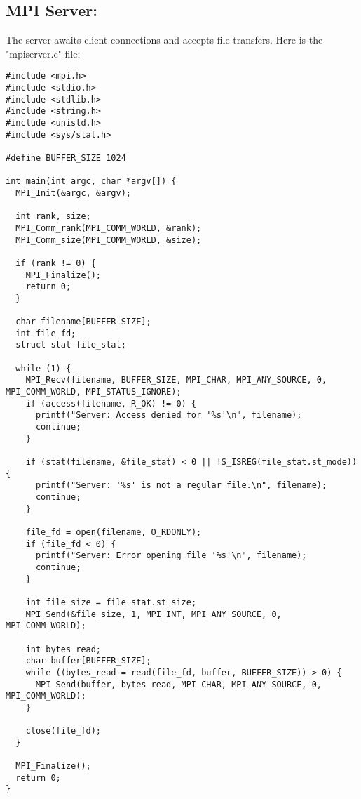 \documentclass{article}
\begin{document}
\subsection{MPI Server:}
The server awaits client connections and accepts file transfers. Here is the "mpiserver.c" file:
\begin{verbatim}
#include <mpi.h>
#include <stdio.h>
#include <stdlib.h>
#include <string.h>
#include <unistd.h>  
#include <sys/stat.h>  

#define BUFFER_SIZE 1024

int main(int argc, char *argv[]) {
  MPI_Init(&argc, &argv);

  int rank, size;
  MPI_Comm_rank(MPI_COMM_WORLD, &rank);
  MPI_Comm_size(MPI_COMM_WORLD, &size);

  if (rank != 0) {
    MPI_Finalize();
    return 0;
  }

  char filename[BUFFER_SIZE];
  int file_fd;
  struct stat file_stat;

  while (1) {
    MPI_Recv(filename, BUFFER_SIZE, MPI_CHAR, MPI_ANY_SOURCE, 0, MPI_COMM_WORLD, MPI_STATUS_IGNORE);
    if (access(filename, R_OK) != 0) {
      printf("Server: Access denied for '%s'\n", filename);
      continue;
    }

    if (stat(filename, &file_stat) < 0 || !S_ISREG(file_stat.st_mode)) {
      printf("Server: '%s' is not a regular file.\n", filename);
      continue;
    }

    file_fd = open(filename, O_RDONLY);
    if (file_fd < 0) {
      printf("Server: Error opening file '%s'\n", filename);
      continue;
    }

    int file_size = file_stat.st_size;
    MPI_Send(&file_size, 1, MPI_INT, MPI_ANY_SOURCE, 0, MPI_COMM_WORLD);

    int bytes_read;
    char buffer[BUFFER_SIZE];
    while ((bytes_read = read(file_fd, buffer, BUFFER_SIZE)) > 0) {
      MPI_Send(buffer, bytes_read, MPI_CHAR, MPI_ANY_SOURCE, 0, MPI_COMM_WORLD);
    }

    close(file_fd);
  }

  MPI_Finalize();
  return 0;
}


\end{verbatim}
\end{document}
